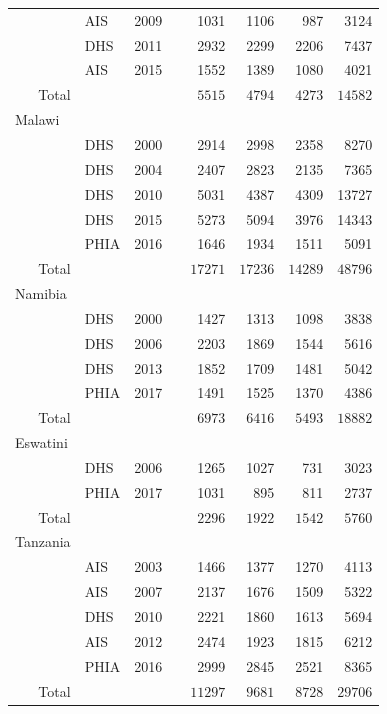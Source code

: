\documentclass[a4paper, nobind]{templates/ociamthesis}
\newcommand{\cmark}{\ding{51}}
\newcommand{\xmark}{\ding{55}}
\begin{document}
\begin{longtable}{rlrcrrrr}
\midrule
 & AIS & 2009 & \xmark & 1031 & 1106 & 987 & 3124 \\ 
 & DHS & 2011 & \xmark & 2932 & 2299 & 2206 & 7437 \\ 
 & AIS & 2015 & \xmark & 1552 & 1389 & 1080 & 4021 \\ 
Total &  &  &  & $5515$ & $4794$ & $4273$ & $14582$ \\ 
\midrule
\multicolumn{1}{l}{Malawi} \\ 
\midrule
 & DHS & 2000 & \xmark & 2914 & 2998 & 2358 & 8270 \\ 
 & DHS & 2004 & \xmark & 2407 & 2823 & 2135 & 7365 \\ 
 & DHS & 2010 & \xmark & 5031 & 4387 & 4309 & 13727 \\ 
 & DHS & 2015 & \cmark & 5273 & 5094 & 3976 & 14343 \\ 
 & PHIA & 2016 & \cmark & 1646 & 1934 & 1511 & 5091 \\ 
Total &  &  &  & $17271$ & $17236$ & $14289$ & $48796$ \\ 
\midrule
\multicolumn{1}{l}{Namibia} \\ 
\midrule
 & DHS & 2000 & \xmark & 1427 & 1313 & 1098 & 3838 \\ 
 & DHS & 2006 & \xmark & 2203 & 1869 & 1544 & 5616 \\ 
 & DHS & 2013 & \xmark & 1852 & 1709 & 1481 & 5042 \\ 
 & PHIA & 2017 & \cmark & 1491 & 1525 & 1370 & 4386 \\ 
Total &  &  &  & $6973$ & $6416$ & $5493$ & $18882$ \\ 
\midrule
\multicolumn{1}{l}{Eswatini} \\ 
\midrule
 & DHS & 2006 & \xmark & 1265 & 1027 & 731 & 3023 \\ 
 & PHIA & 2017 & \xmark & 1031 & 895 & 811 & 2737 \\ 
Total &  &  &  & $2296$ & $1922$ & $1542$ & $5760$ \\ 
\midrule
\multicolumn{1}{l}{Tanzania} \\ 
\midrule
 & AIS & 2003 & \xmark & 1466 & 1377 & 1270 & 4113 \\ 
 & AIS & 2007 & \xmark & 2137 & 1676 & 1509 & 5322 \\ 
 & DHS & 2010 & \xmark & 2221 & 1860 & 1613 & 5694 \\ 
 & AIS & 2012 & \xmark & 2474 & 1923 & 1815 & 6212 \\ 
 & PHIA & 2016 & \cmark & 2999 & 2845 & 2521 & 8365 \\ 
Total &  &  &  & $11297$ & $9681$ & $8728$ & $29706$ \\ 

\end{longtable}
\end{document}
